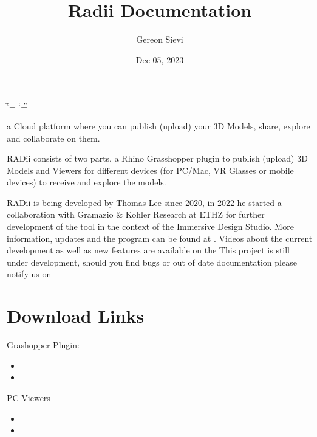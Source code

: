\documentclass[letterpaper,10pt,english]{sphinxmanual}
\title{Radii Documentation}
\date{Dec 05, 2023}
\author{Gereon Sievi}
\begin{document}
\ifdefined\shorthandoff
  \ifnum\catcode`\=\string=\active\shorthandoff{=}\fi
  \ifnum\catcode`\"=\active{}\fi
\fi

\pagestyle{empty}
\sphinxmaketitle
\pagestyle{plain}
\sphinxtableofcontents
\pagestyle{normal}
\label{\detokenize{index::doc}}
\noindent{}



\sphinxAtStartPar
{} a Cloud platform where you can publish (upload) your
3D Models, share, explore and collaborate on them.

\sphinxAtStartPar
RADii consists of two parts, a Rhino Grasshopper plugin to publish (upload) 3D Models and Viewers for different devices (for PC/Mac, VR Glasses or mobile devices) to receive and explore the models.

\sphinxAtStartPar
RADii is being developed by Thomas Lee since 2020, in 2022 he started a collaboration with Gramazio \& Kohler Research at ETHZ for further development of the tool in the context of the Immersive Design Studio.
More information, updates and the program can be found at .
Videos about the current development as well as new features are available on the 
This project is still under development, should you find bugs or out of date documentation please notify us on 


\chapter{Download Links}
\label{\detokenize{index:download-links}}
\sphinxAtStartPar
Grashopper Plugin:
\begin{itemize}
\item {} 
\sphinxAtStartPar
{}

\item {} 
\sphinxAtStartPar
{}

\end{itemize}

\sphinxAtStartPar
PC Viewers
\begin{itemize}
\item {} 
\sphinxAtStartPar
{}

\item {} 
\sphinxAtStartPar
{}

\end{itemize}
\end{document}

